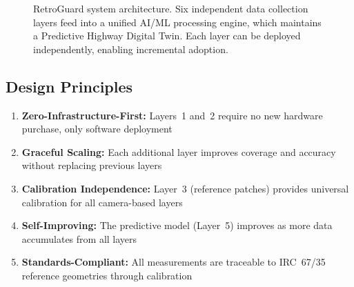 \documentclass[11pt,a4paper]{article}
\begin{document}
\begin{figure}[H]
\caption{RetroGuard system architecture. Six independent data collection layers feed into a unified AI/ML processing engine, which maintains a Predictive Highway Digital Twin. Each layer can be deployed independently, enabling incremental adoption.}
\label{fig:architecture}
\end{figure}

\subsection{Design Principles}

\begin{enumerate}[noitemsep]
    \item \textbf{Zero-Infrastructure-First:} Layers~1 and~2 require no new hardware purchase, only software deployment
    \item \textbf{Graceful Scaling:} Each additional layer improves coverage and accuracy without replacing previous layers
    \item \textbf{Calibration Independence:} Layer~3 (reference patches) provides universal calibration for all camera-based layers
    \item \textbf{Self-Improving:} The predictive model (Layer~5) improves as more data accumulates from all layers
    \item \textbf{Standards-Compliant:} All measurements are traceable to IRC~67/35 reference geometries through calibration
\end{enumerate}
\end{document}
